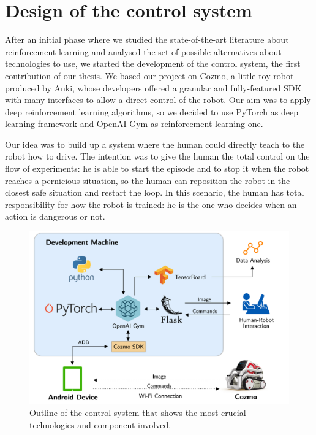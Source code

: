 \documentclass[10pt,twocolumn,letterpaper]{article}
\begin{document}
\section{Design of the control system}

After an initial phase where we studied the state-of-the-art literature about reinforcement learning and analysed the set of possible alternatives about technologies to use, we started the development of the control system, the first contribution of our thesis.
We based our project on Cozmo, a little toy robot produced by Anki, whose developers offered a granular and fully-featured SDK with many interfaces to allow a direct control of the robot. Our aim was to apply deep reinforcement learning algorithms, so we decided to use PyTorch as deep learning framework and OpenAI Gym as reinforcement learning one.

Our idea was to build up a system where the human could directly teach to the robot how to drive.
The intention was to give the human the total control on the flow of experiments: he is able to start the episode and to stop it when the robot reaches a pernicious situation, so the human can reposition the robot in the closest safe situation and restart the loop. In this scenario, the human has total responsibility for how the robot is trained: he is the one who decides when an action is dangerous or not.

\begin{figure}[tbp]
    \centering
    \includegraphics[width=0.97\columnwidth]{cozmo-system.png}
    \caption[Outline of the control system]{Outline of the control system that shows the most crucial technologies and component involved.}
    \label{system}
\end{figure}
\end{document}
